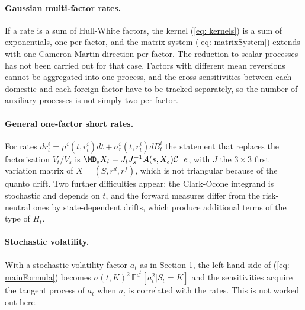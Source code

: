 \paragraph{Gaussian multi-factor rates.} If a rate is a sum of Hull-White factors, the kernel (\ref{eq: kernels}) is a sum of exponentials, one per factor, and the matrix system (\ref{eq: matrixSystem}) extends with one Cameron-Martin direction per factor. The reduction to scalar processes has not been carried out for that case. Factors with different mean reversions cannot be aggregated into one process, and the cross sensitivities between each domestic and each foreign factor have to be tracked separately, so the number of auxiliary processes is not simply two per factor.

\paragraph{General one-factor short rates.} For rates $dr^i_t=\mu^i(t,r^i_t)dt+\sigma^i_r(t,r^i_t)dB^i_t$ the statement that replaces the factorisation $V_t/V_s$ is $\MD_sX_t=J_tJ_s^{-1}\mathcal{A}(s,X_s)\mathcal{C}^\top e$, with $J$ the $3\times3$ first variation matrix of $X=(S,r^d,r^f)$, which is not triangular because of the quanto drift. Two further difficulties appear: the Clark-Ocone integrand is stochastic and depends on $t$, and the forward measures differ from the risk-neutral ones by state-dependent drifts, which produce additional terms of the type of $H_t$.

\paragraph{Stochastic volatility.} With a stochastic volatility factor $a_t$ as in Section 1, the left hand side of (\ref{eq: mainFormula}) becomes $\sigma(t,K)^2\,\mathbb{E}^{d^t}[a_t^2|S_t=K]$ and the sensitivities acquire the tangent process of $a_t$ when $a_t$ is correlated with the rates. This is not worked out here.
